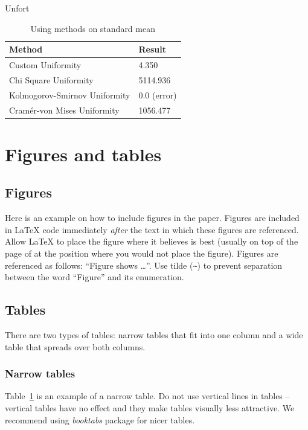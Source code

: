 \documentclass[10pt, a4paper]{article}
\begin{document}
Unfort
\begin{table}
\caption{Using methods on standard mean}
\label{tab:narrow-table}
\begin{center}
\begin{tabular}{ll}
\toprule
Method & Result \\
\midrule
Custom Uniformity & 4.350 \\
Chi Square Uniformity & 5114.936 \\
Kolmogorov-Smirnov Uniformity & 0.0 (error) \\
Cramér-von Mises Uniformity & 1056.477 \\
\bottomrule
\end{tabular}
\end{center}
\end{table}

\section{Figures and tables}

\subsection{Figures}

Here is an example on how to include figures in the paper. Figures are included in \LaTeX{} code immediately \textit{after} the text in which these figures are referenced. Allow \LaTeX{} to place the figure where it believes is best (usually on top of the page of at the position where you would not place the figure). Figures are referenced as follows: ``Figure shows \dots''. Use tilde (\verb.~.) to prevent separation between the word ``Figure'' and its enumeration. 

\subsection{Tables}

There are two types of tables: narrow tables that fit into one column and a wide table that spreads over both columns.

\subsubsection{Narrow tables}

Table~\ref{tab:narrow-table} is an example of a narrow table. Do not use vertical lines in tables -- vertical tables have no effect and they make tables visually less attractive. We recommend using \textit{booktabs} package for nicer tables.
\end{document}
